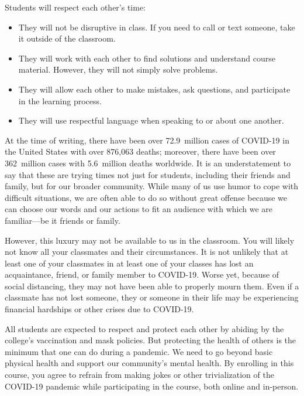 \documentclass[11pt,letterpaper]{article}
\begin{document}
Students will respect each other's time:
	\begin{itemize}
	\item They will not be disruptive in class. If you need to call or text someone, take it outside of the classroom. 
	\item They will work with each other to find solutions and understand course material. However, they will not simply solve problems. 
	\item They will allow each other to make mistakes, ask questions, and participate in the learning process. 
	\item They will use respectful language when speaking to or about one another. 
	\end{itemize}
\sectionbreak



At the time of writing, there have been over 72.9~million cases of COVID-19 in the United States with over 876,063 deaths; moreover, there have been over 362~million cases with 5.6~million deaths worldwide. It is an understatement to say that these are trying times not just for students, including their friends and family, but for our broader community. While many of us use humor to cope with difficult situations, we are often able to do so without great offense because we can choose our words and our actions to fit an audience with which we are familiar---be it friends or family. \pspace

However, this luxury may not be available to us in the classroom. You will likely not know all your classmates and their circumstances. It is not unlikely that at least one of your classmates in at least one of your classes has lost an acquaintance, friend, or family member to COVID-19. Worse yet, because of social distancing, they may not have been able to properly mourn them. Even if a classmate has not lost someone, they or someone in their life may be experiencing financial hardships or other crises due to COVID-19. \pspace

All students are expected to respect and protect each other by abiding by the college's vaccination and mask policies. But protecting the health of others is the minimum that one can do during a pandemic. We need to go beyond basic physical health and support our community's mental health. By enrolling in this course, you agree to refrain from making jokes or other trivialization of the COVID-19 pandemic while participating in the course, both online and in-person.
\sectionbreak
\end{document}

